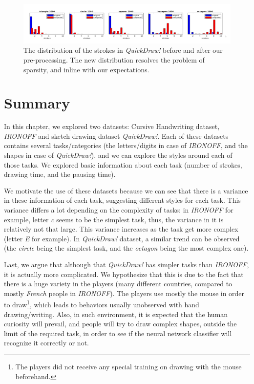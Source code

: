     \begin{figure}
    \centering
    \includegraphics[scale=0.77]{images/dataset/stat_quickdraw_new.png}
    \caption{The distribution of the strokes in \textit{QuickDraw!} before and after our pre-processing. The new distribution resolves the problem of sparsity, and inline with our expectations.}
    \label{fig:quickdraw_newstrokes}
    \end{figure}
\section{Summary}
  \par In this chapter, we explored two datasets: Cursive Handwriting dataset, \textit{IRONOFF} and sketch drawing dataset \textit{QuickDraw!}. Each of these datasets contains several tasks/categories (the letters/digits in case of \textit{IRONOFF}, and the shapes in case of \textit{QuickDraw!}), and we can explore the styles around each of those tasks. We explored basic information about each task (number of strokes, drawing time, and the pausing time).

  \par We motivate the use of these datasets because we can see that there is a variance in these information of each task, suggesting different styles for each task. This variance differs a lot depending on the complexity of tasks: in \textit{IRONOFF} for example, letter \textit{c} seems to be the simplest task, thus, the variance in it is relatively not that large. This variance increases as the task get more complex (letter \textit{E} for example). In \textit{QuickDraw!} dataset, a similar trend can be observed (the \textit{circle} being the simplest task, and the \textit{octagon} being the most complex one).

  \par Last, we argue that although that \textit{QuickDraw!} has simpler tasks than \textit{IRONOFF}, it is actually more complicated. We hypothesize that this is due to the fact that there is a huge variety in the players (many different countries, compared to mostly \textit{French} people in \textit{IRONOFF}). The players use mostly the mouse in order to draw\footnote{The players did not receive any special training on drawing with the mouse beforehand.}, which leads to behaviors usually unobserved with hand drawing/writing. Also, in such environment, it is expected that the human curiosity will prevail, and people will try to draw complex shapes, outside the limit of the required task, in order to see if the neural network classifier will recognize it correctly or not.

